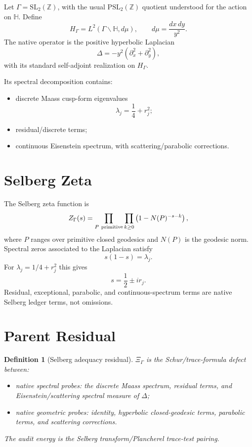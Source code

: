 \documentclass[11pt]{article}
\newtheorem{definition}{Definition}
\newcommand{\Hh}{\mathbb H}
\newcommand{\XiGamma}{\Xi_{\Gamma}}
\newcommand{\ZG}{Z_{\Gamma}}
\begin{document}
Let \(\Gamma=\mathrm{SL}_2(\mathbb Z)\), with the usual
\(\mathrm{PSL}_2(\mathbb Z)\) quotient understood for the action on
\(\Hh\).  Define
\[
H_\Gamma=L^2(\Gamma\backslash\Hh,d\mu),
\qquad
d\mu=\frac{dx\,dy}{y^2}.
\]
The native operator is the positive hyperbolic Laplacian
\[
\Delta=-y^2\left(\partial_x^2+\partial_y^2\right),
\]
with its standard self-adjoint realization on \(H_\Gamma\).

Its spectral decomposition contains:
\begin{itemize}
\item discrete Maass cusp-form eigenvalues
\[
\lambda_j=\frac14+r_j^2;
\]
\item residual/discrete terms;
\item continuous Eisenstein spectrum, with scattering/parabolic corrections.
\end{itemize}

\section*{Selberg Zeta}

The Selberg zeta function is
\[
\ZG(s)
=
\prod_{P\ {\rm primitive}}
\prod_{k\ge0}
\left(1-N(P)^{-s-k}\right),
\]
where \(P\) ranges over primitive closed geodesics and \(N(P)\) is the
geodesic norm.  Spectral zeros associated to the Laplacian satisfy
\[
s(1-s)=\lambda_j.
\]
For \(\lambda_j=1/4+r_j^2\) this gives
\[
s=\frac12\pm ir_j.
\]
Residual, exceptional, parabolic, and continuous-spectrum terms are native
Selberg ledger terms, not omissions.

\section*{Parent Residual}

\begin{definition}[Selberg adequacy residual]
\(\XiGamma\) is the Schur/trace-formula defect between:
\begin{itemize}
\item native spectral probes: the discrete Maass spectrum, residual terms, and
Eisenstein/scattering spectral measure of \(\Delta\);
\item native geometric probes: identity, hyperbolic closed-geodesic terms,
parabolic terms, and scattering corrections.
\end{itemize}
The audit energy is the Selberg transform/Plancherel trace-test pairing.
\end{definition}
\end{document}
